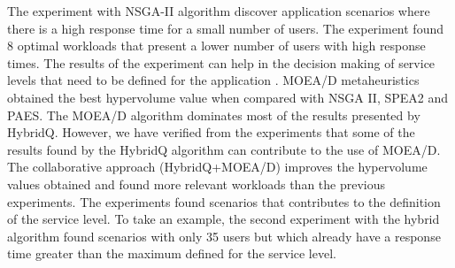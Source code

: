 \documentclass[espaco=umemeio,chapter=TITLE,twoside,openright]{abnt}
\begin{document}
The experiment with NSGA-II algorithm discover application scenarios where there is a high response time for a small number of users. The experiment found 8 optimal workloads that present a lower number of users with high response times. The results of the experiment can help in the decision making of service levels that need to be defined for the application \cite{Gois2017}. MOEA/D metaheuristics obtained the best hypervolume value when compared with NSGA II, SPEA2 and PAES. The MOEA/D algorithm dominates most of the results presented by HybridQ. However, we have verified from the experiments that some of the results found by the HybridQ algorithm can contribute to the use of MOEA/D. The collaborative approach (HybridQ+MOEA/D) improves the hypervolume values obtained and found more relevant workloads than the previous experiments. The experiments found  scenarios that contributes to the definition of the service level. To take an example, the second experiment with the hybrid algorithm found scenarios with only 35 users but which already have a response time greater than the maximum defined for the service level.
\end{document}
